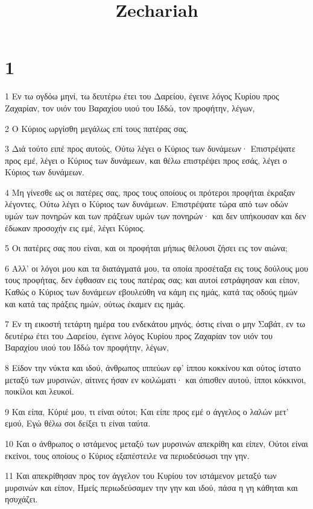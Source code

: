 

\title{Zechariah}


\chapter{1}

\par 1 Εν τω ογδόω μηνί, τω δευτέρω έτει του Δαρείου, έγεινε λόγος Κυρίου προς Ζαχαρίαν, τον υιόν του Βαραχίου υιού του Ιδδώ, τον προφήτην, λέγων,
\par 2 Ο Κύριος ωργίσθη μεγάλως επί τους πατέρας σας.
\par 3 Διά τούτο ειπέ προς αυτούς, Ούτω λέγει ο Κύριος των δυνάμεων· Επιστρέψατε προς εμέ, λέγει ο Κύριος των δυνάμεων, και θέλω επιστρέψει προς εσάς, λέγει ο Κύριος των δυνάμεων.
\par 4 Μη γίνεσθε ως οι πατέρες σας, προς τους οποίους οι πρότεροι προφήται έκραξαν λέγοντες, Ούτω λέγει ο Κύριος των δυνάμεων. Επιστρέψατε τώρα από των οδών υμών των πονηρών και των πράξεων υμών των πονηρών· και δεν υπήκουσαν και δεν έδωκαν προσοχήν εις εμέ, λέγει Κύριος.
\par 5 Οι πατέρες σας που είναι, και οι προφήται μήπως θέλουσι ζήσει εις τον αιώνα;
\par 6 Αλλ' οι λόγοι μου και τα διατάγματά μου, τα οποία προσέταξα εις τους δούλους μου τους προφήτας, δεν έφθασαν εις τους πατέρας σας; και αυτοί εστράφησαν και είπον, Καθώς ο Κύριος των δυνάμεων εβουλεύθη να κάμη εις ημάς, κατά τας οδούς ημών και κατά τας πράξεις ημών, ούτως έκαμεν εις ημάς.
\par 7 Εν τη εικοστή τετάρτη ημέρα του ενδεκάτου μηνός, όστις είναι ο μην Σαβάτ, εν τω δευτέρω έτει του Δαρείου, έγεινε λόγος Κυρίου προς Ζαχαρίαν τον υιόν του Βαραχίου υιού του Ιδδώ τον προφήτην, λέγων,
\par 8 Είδον την νύκτα και ιδού, άνθρωπος ιππεύων εφ' ίππου κοκκίνου και ούτος ίστατο μεταξύ των μυρσινών, αίτινες ήσαν εν κοιλώματι· και όπισθεν αυτού, ίπποι κόκκινοι, ποικίλοι και λευκοί.
\par 9 Και είπα, Κύριέ μου, τι είναι ούτοι; Και είπε προς εμέ ο άγγελος ο λαλών μετ' εμού, Εγώ θέλω σοι δείξει τι είναι ταύτα.
\par 10 Και ο άνθρωπος ο ιστάμενος μεταξύ των μυρσινών απεκρίθη και είπεν, Ούτοι είναι εκείνοι, τους οποίους ο Κύριος εξαπέστειλε να περιοδεύσωσι την γην.
\par 11 Και απεκρίθησαν προς τον άγγελον του Κυρίου τον ιστάμενον μεταξύ των μυρσινών και είπον, Ημείς περιωδεύσαμεν την γην και ιδού, πάσα η γη κάθηται και ησυχάζει.

